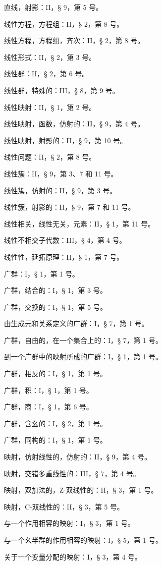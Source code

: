 直线，射影：II，§ 9，第 5 号。

线性方程，方程组：II，§ 2，第 8 号。

线性方程，方程组，齐次：II，§ 2，第 8 号。

线性形式：II，§ 2，第 3 号。

线性群：II，§ 2，第 6 号。

线性群，特殊的：III，§ 8，第 9 号。

线性映射：II，§ 1，第 2 号。

线性映射，函数，仿射的：II，§ 9，第 4 号。

线性映射，射影的：II，§ 9，第 10 号。

线性问题：II，§ 2，第 8 号。

线性簇：II，§ 9，第 3、7 和 11 号。

线性簇，仿射的：II，§ 9，第 3 号。

线性簇，射影的：II，§ 9，第 7 和 11 号。

线性相关，线性无关，元素：II，§ 1，第 11 号。

线性不相交子代数：III，§ 4，第 4 号。

线性性，延拓原理：II，§ 1，第 7 号。

广群：I，§ 1，第 1 号。

广群，结合的：I，§ 1，第 3 号。

广群，交换的：I，§ 1，第 5 号。

由生成元和关系定义的广群：I，§ 7，第 1 号。

广群，自由的，在一个集合上的：I，§ 7，第 1 号。

到一个广群中的映射所成的广群：I，§ 1，第 1 号。

广群，相反的：I，§ 1，第 1 号。

广群，积：I，§ 1，第 1 号。

广群，商：I，§ 1，第 6 号。

广群，含幺的：I，§ 2，第 1 号。

广群，同构的：I，§ 1，第 1 号。

映射，仿射线性的，仿射的：II，§ 9，第 4 号。

映射，交错多重线性的：III，§ 7，第 4 号。

映射，双加法的，Z-双线性的：II，§ 3，第 1 号。

映射，C-双线性的：II，§ 3，第 5 号。

与一个作用相容的映射：I，§ 3，第 1 号。

与一个幺半群的作用相容的映射：I，§ 5，第 1 号。

关于一个变量分配的映射：I，§ 3，第 4 号。

